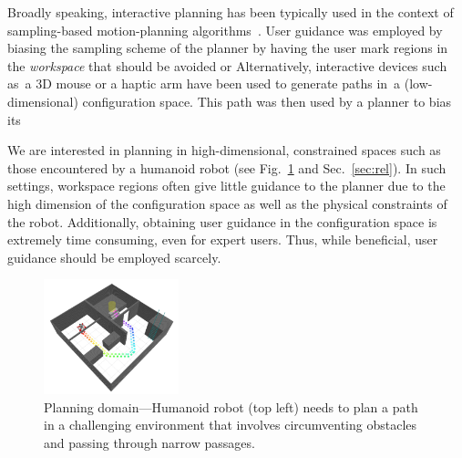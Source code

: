 \documentclass{article}
\begin{document}
Broadly speaking, interactive planning has been typically used in the context of sampling-based motion-planning algorithms~\cite{L06}.
User guidance was employed by biasing the sampling scheme of the planner by having the user mark regions in the \emph{workspace} that should be avoided or 
Alternatively, interactive devices such as~a 3D mouse or a haptic arm have been used to generate paths in~a (low-dimensional) configuration space. This path was then used by a planner to bias its 

We are interested in planning in high-dimensional, constrained spaces such as those encountered by a humanoid robot (see Fig.~\ref{fig:robot} and Sec.~\ref{sec:rel}).
In such settings, workspace regions often give little guidance to the planner due to the high dimension of the configuration space as well as the physical constraints of the robot.
Additionally, obtaining user guidance in the configuration space is extremely time consuming, even for expert users.
Thus,  while beneficial, user guidance should be employed scarcely.

\begin{figure}[tb]
  \centering
  	\includegraphics[trim={5cm 6cm 2.5cm 2.5cm},clip, width=0.35\textwidth]{fig/cover3.png}
  	\vspace{-2mm}
  \caption{
  Planning domain---Humanoid robot (top left) needs to plan a path in a challenging environment that involves circumventing obstacles and passing through narrow passages.
}
   	\label{fig:robot}
\end{figure}
\end{document}
